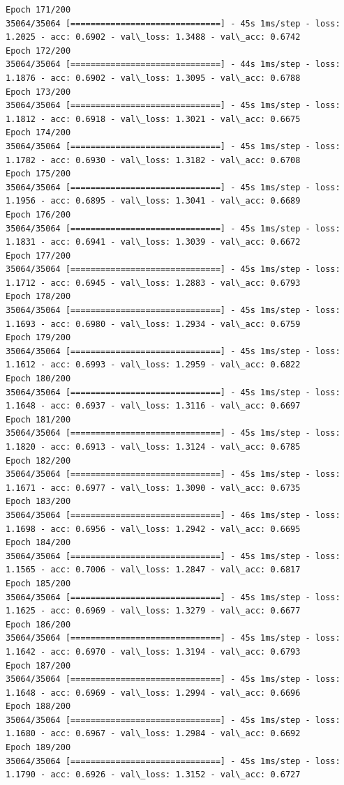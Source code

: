 \documentclass[11pt]{article}
\begin{document}
\begin{Verbatim}[commandchars=\\\{\}]
Epoch 171/200
35064/35064 [==============================] - 45s 1ms/step - loss: 1.2025 - acc: 0.6902 - val\_loss: 1.3488 - val\_acc: 0.6742
Epoch 172/200
35064/35064 [==============================] - 44s 1ms/step - loss: 1.1876 - acc: 0.6902 - val\_loss: 1.3095 - val\_acc: 0.6788
Epoch 173/200
35064/35064 [==============================] - 45s 1ms/step - loss: 1.1812 - acc: 0.6918 - val\_loss: 1.3021 - val\_acc: 0.6675
Epoch 174/200
35064/35064 [==============================] - 45s 1ms/step - loss: 1.1782 - acc: 0.6930 - val\_loss: 1.3182 - val\_acc: 0.6708
Epoch 175/200
35064/35064 [==============================] - 45s 1ms/step - loss: 1.1956 - acc: 0.6895 - val\_loss: 1.3041 - val\_acc: 0.6689
Epoch 176/200
35064/35064 [==============================] - 45s 1ms/step - loss: 1.1831 - acc: 0.6941 - val\_loss: 1.3039 - val\_acc: 0.6672
Epoch 177/200
35064/35064 [==============================] - 45s 1ms/step - loss: 1.1712 - acc: 0.6945 - val\_loss: 1.2883 - val\_acc: 0.6793
Epoch 178/200
35064/35064 [==============================] - 45s 1ms/step - loss: 1.1693 - acc: 0.6980 - val\_loss: 1.2934 - val\_acc: 0.6759
Epoch 179/200
35064/35064 [==============================] - 45s 1ms/step - loss: 1.1612 - acc: 0.6993 - val\_loss: 1.2959 - val\_acc: 0.6822
Epoch 180/200
35064/35064 [==============================] - 45s 1ms/step - loss: 1.1648 - acc: 0.6937 - val\_loss: 1.3116 - val\_acc: 0.6697
Epoch 181/200
35064/35064 [==============================] - 45s 1ms/step - loss: 1.1820 - acc: 0.6913 - val\_loss: 1.3124 - val\_acc: 0.6785
Epoch 182/200
35064/35064 [==============================] - 45s 1ms/step - loss: 1.1671 - acc: 0.6977 - val\_loss: 1.3090 - val\_acc: 0.6735
Epoch 183/200
35064/35064 [==============================] - 46s 1ms/step - loss: 1.1698 - acc: 0.6956 - val\_loss: 1.2942 - val\_acc: 0.6695
Epoch 184/200
35064/35064 [==============================] - 45s 1ms/step - loss: 1.1565 - acc: 0.7006 - val\_loss: 1.2847 - val\_acc: 0.6817
Epoch 185/200
35064/35064 [==============================] - 45s 1ms/step - loss: 1.1625 - acc: 0.6969 - val\_loss: 1.3279 - val\_acc: 0.6677
Epoch 186/200
35064/35064 [==============================] - 45s 1ms/step - loss: 1.1642 - acc: 0.6970 - val\_loss: 1.3194 - val\_acc: 0.6793
Epoch 187/200
35064/35064 [==============================] - 45s 1ms/step - loss: 1.1648 - acc: 0.6969 - val\_loss: 1.2994 - val\_acc: 0.6696
Epoch 188/200
35064/35064 [==============================] - 45s 1ms/step - loss: 1.1680 - acc: 0.6967 - val\_loss: 1.2984 - val\_acc: 0.6692
Epoch 189/200
35064/35064 [==============================] - 45s 1ms/step - loss: 1.1790 - acc: 0.6926 - val\_loss: 1.3152 - val\_acc: 0.6727

\end{Verbatim}
\end{document}
